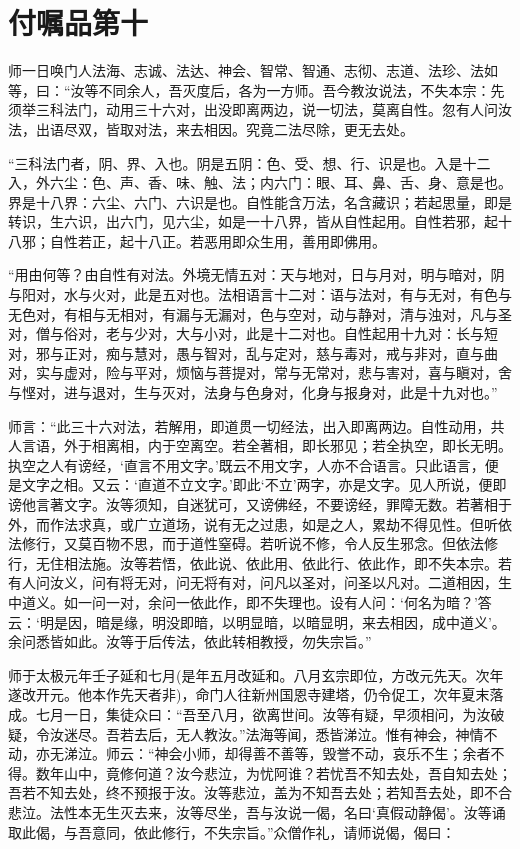 \documentclass[UTF8, 11pt, oneside]{ctexart}
\begin{document}
\section*{付嘱品第十}

师一日唤门人法海、志诚、法达、神会、智常、智通、志彻、志道、法珍、法如等，曰：“汝等不同余人，吾灭度后，各为一方师。吾今教汝说法，不失本宗：先须举三科法门，动用三十六对，出没即离两边，说一切法，莫离自性。忽有人问汝法，出语尽双，皆取对法，来去相因。究竟二法尽除，更无去处。

“三科法门者，阴、界、入也。阴是五阴：色、受、想、行、识是也。入是十二入，外六尘：色、声、香、味、触、法；内六门：眼、耳、鼻、舌、身、意是也。界是十八界：六尘、六门、六识是也。自性能含万法，名含藏识；若起思量，即是转识，生六识，出六门，见六尘，如是一十八界，皆从自性起用。自性若邪，起十八邪；自性若正，起十八正。若恶用即众生用，善用即佛用。

“用由何等？由自性有对法。外境无情五对：天与地对，日与月对，明与暗对，阴与阳对，水与火对，此是五对也。法相语言十二对：语与法对，有与无对，有色与无色对，有相与无相对，有漏与无漏对，色与空对，动与静对，清与浊对，凡与圣对，僧与俗对，老与少对，大与小对，此是十二对也。自性起用十九对：长与短对，邪与正对，痴与慧对，愚与智对，乱与定对，慈与毒对，戒与非对，直与曲对，实与虚对，险与平对，烦恼与菩提对，常与无常对，悲与害对，喜与瞋对，舍与悭对，进与退对，生与灭对，法身与色身对，化身与报身对，此是十九对也。”

师言：“此三十六对法，若解用，即道贯一切经法，出入即离两边。自性动用，共人言语，外于相离相，内于空离空。若全著相，即长邪见；若全执空，即长无明。执空之人有谤经，‘直言不用文字。’既云不用文字，人亦不合语言。只此语言，便是文字之相。又云：‘直道不立文字。’即此‘不立’两字，亦是文字。见人所说，便即谤他言著文字。汝等须知，自迷犹可，又谤佛经，不要谤经，罪障无数。若著相于外，而作法求真，或广立道场，说有无之过患，如是之人，累劫不得见性。但听依法修行，又莫百物不思，而于道性窒碍。若听说不修，令人反生邪念。但依法修行，无住相法施。汝等若悟，依此说、依此用、依此行、依此作，即不失本宗。若有人问汝义，问有将无对，问无将有对，问凡以圣对，问圣以凡对。二道相因，生中道义。如一问一对，余问一依此作，即不失理也。设有人问：‘何名为暗？’答云：‘明是因，暗是缘，明没即暗，以明显暗，以暗显明，来去相因，成中道义’。余问悉皆如此。汝等于后传法，依此转相教授，勿失宗旨。”

师于太极元年壬子延和七月(是年五月改延和。八月玄宗即位，方改元先天。次年遂改开元。他本作先天者非)，命门人往新州国恩寺建塔，仍令促工，次年夏末落成。七月一日，集徒众曰：“吾至八月，欲离世间。汝等有疑，早须相问，为汝破疑，令汝迷尽。吾若去后，无人教汝。”法海等闻，悉皆涕泣。惟有神会，神情不动，亦无涕泣。师云：“神会小师，却得善不善等，毁誉不动，哀乐不生；余者不得。数年山中，竟修何道？汝今悲泣，为忧阿谁？若忧吾不知去处，吾自知去处；吾若不知去处，终不预报于汝。汝等悲泣，盖为不知吾去处；若知吾去处，即不合悲泣。法性本无生灭去来，汝等尽坐，吾与汝说一偈，名曰‘真假动静偈’。汝等诵取此偈，与吾意同，依此修行，不失宗旨。”众僧作礼，请师说偈，偈曰：
\end{document}
